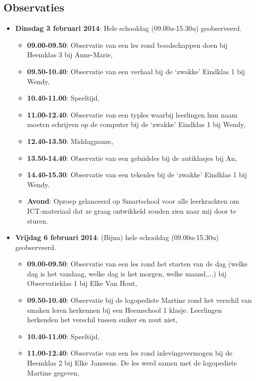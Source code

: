 \documentclass[a4paper,11pt]{article}
\theoremstyle{definition}
\begin{document}
\begin{itemize}
\begin{itemize}
\subsection{Observaties}
\begin{itemize}
  \item \textbf{Dinsdag 3 februari 2014}: Hele schooldag (09.00u-15.30u) 
  geobserveerd.
    \begin{itemize}
    \item \textbf{09.00-09.50}:   Observatie van een les rond boodschappen doen bij Heemklas 3 bij Anne-Marie,
    \item \textbf{09.50-10.40}:   Observatie van een verhaal bij de `zwakke' Eindklas 1 bij Wendy,
    \item \textbf{10.40-11.00}:   Speeltijd,
     \item \textbf{11.00-12.40}:  Observatie van een typles waarbij leerlingen hun naam moeten schrijven op de computer bij de `zwakke' Eindklas 1 bij Wendy,
    \item \textbf{12.40-13.50}:   Middagpauze,
    \item \textbf{13.50-14.40}:   Observatie van een geluidsles bij de autiklasjes bij An,
    \item \textbf{14.40-15.30}:   Observatie van een tekenles bij de `zwakke' Eindklas 1 bij Wendy. 
    \item \textbf{Avond}: Oproep gelanceerd op Smartschool voor alle 
    leerkrachten om ICT-materiaal dat ze graag ontwikkeld zouden zien naar mij 
    door te sturen.
  \end{itemize}
  \item \textbf{Vrijdag 6 februari 2014}: (Bijna) hele schooldag (09.00u-15.30u) 
  geobserveerd.
    \begin{itemize}
    \item \textbf{09.00-09.50}:   Observatie van een les rond het starten van de dag (welke dag is het vandaag, welke dag is het morgen, welke maand,...) bij Observatieklas 1 bij Elke Van Hout,
    \item \textbf{09.50-10.40}:   Observatie bij de logopediste Martine rond het verschil van smaken leren herkennen bij een Heemschool 1 klasje. Leerlingen herkenden het verschil tussen suiker en zout niet, 
    \item \textbf{10.40-11.00}:   Speeltijd,
    \item \textbf{11.00-12.40}:   Observatie van een les rond inlevingsvermogen bij de Heemklas 2 bij Elke Janssens. De les werd samen met de logopediste Martine gegeven,

\end{itemize}
\end{itemize}
\end{itemize}
\end{itemize}
\end{document}
